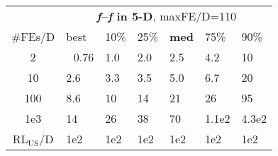 \begin{tabular}{c|llllll}
 & \multicolumn{6}{|c}{\textbf{\textit{f}\raisebox{-0.35ex}{1}--\textit{f}\raisebox{-0.35ex}{24} in 5-D}, maxFE/D=110}\\
\#FEs/D & best & 10\% & 25\% & \textbf{med} & 75\% & 90\%\\
2 & ~\,0.76 & \hspace*{1ex}1.0 & \hspace*{1ex}2.0 & \hspace*{1ex}2.5 & \hspace*{1ex}4.2 & 10\\
10 & \hspace*{1ex}2.6 & \hspace*{1ex}3.3 & \hspace*{1ex}3.5 & \hspace*{1ex}5.0 & \hspace*{1ex}6.7 & 20\\
100 & \hspace*{1ex}8.6 & 10 & 14 & 21 & 26 & 95\\
1e3 & 14 & 26 & 38 & 70 & 1.1e2 & 4.3e2\\
$\text{RL}_{\text{US}}$/D & 1e2 & 1e2 & 1e2 & 1e2 & 1e2 & 1e2
\end{tabular}
